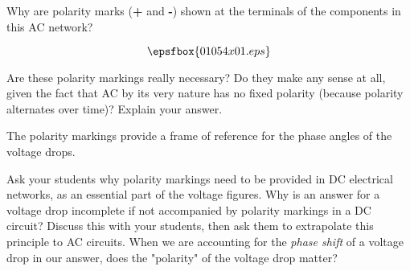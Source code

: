 

Why are polarity marks ({\bf +} and {\bf -}) shown at the terminals of the components in this AC network?

$$\epsfbox{01054x01.eps}$$

Are these polarity markings really necessary?  Do they make any sense at all, given the fact that AC by its very nature has no fixed polarity (because polarity alternates over time)?  Explain your answer.







The polarity markings provide a frame of reference for the phase angles of the voltage drops.







Ask your students why polarity markings need to be provided in DC electrical networks, as an essential part of the voltage figures.  Why is an answer for a voltage drop incomplete if not accompanied by polarity markings in a DC circuit?  Discuss this with your students, then ask them to extrapolate this principle to AC circuits.  When we are accounting for the {\it phase shift} of a voltage drop in our answer, does the "polarity" of the voltage drop matter?



